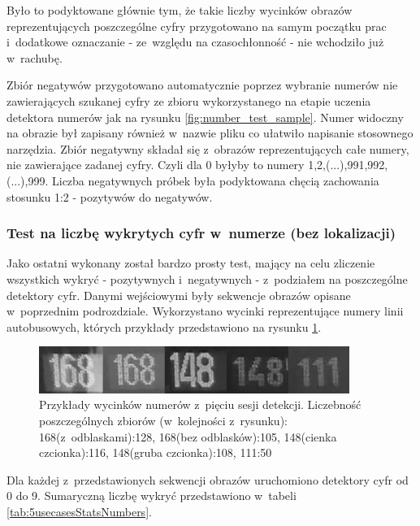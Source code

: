 Było to podyktowane głównie tym, że takie liczby wycinków
obrazów reprezentujących poszczególne cyfry przygotowano na samym początku
prac i~dodatkowe oznaczanie - ze~względu na czasochłonność - nie wchodziło już w~rachubę.

Zbiór negatywów przygotowano automatycznie poprzez wybranie
numerów nie zawierających szukanej cyfry ze zbioru wykorzystanego
na etapie uczenia detektora numerów jak na rysunku \ref{fig:number_test_sample}.
Numer widoczny na obrazie był zapisany również w~nazwie pliku co
ułatwiło napisanie stosownego narzędzia. Zbiór negatywny składał
się z~obrazów reprezentujących całe numery, nie zawierające zadanej cyfry.
Czyli dla 0 byłyby to numery 1,2,(...),991,992,(...),999. Liczba negatywnych
próbek była podyktowana chęcią zachowania stosunku 1:2 - pozytywów do negatywów.

\subsubsection{Test na liczbę wykrytych cyfr w~numerze (bez lokalizacji)}

Jako ostatni wykonany został bardzo prosty test, mający na celu zliczenie
wszystkich wykryć - pozytywnych i~negatywnych - z~podziałem na 
poszczególne detektory cyfr.
Danymi wejściowymi były sekwencje obrazów
opisane w~poprzednim podrozdziale. Wykorzystano wycinki reprezentujące numery linii autobusowych, których przykłady przedstawiono na rysunku \ref{fig:sample_last_input_numbers}.

\begin{figure}[!h]
	\centering
	\includegraphics[width=0.9\textwidth]{img/5sessions/part2-overall}
	\caption{Przykłady wycinków numerów z~pięciu sesji detekcji. Liczebność poszczególnych
		zbiorów (w~kolejności z~rysunku): 168(z~odblaskami):128, 168(bez odblasków):105, 148(cienka czcionka):116, 148(gruba czcionka):108, 111:50}
	\label{fig:sample_last_input_numbers}
\end{figure}

Dla każdej z~przedstawionych sekwencji obrazów uruchomiono detektory cyfr od 0 do 9.
Sumaryczną liczbę wykryć przedstawiono w~tabeli \ref{tab:5usecasesStatsNumbers}.

